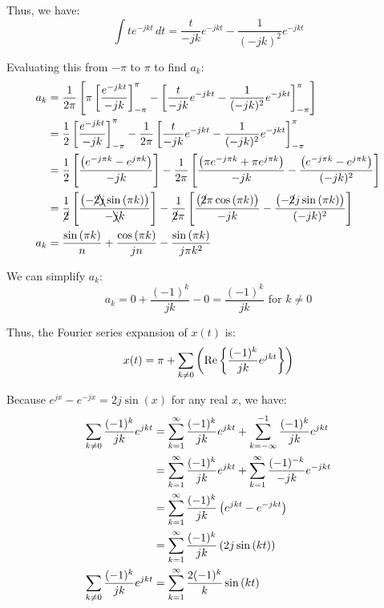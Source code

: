 \documentclass[a4paper, 10pt]{article}
\begin{document}
\begin{tosubmit}
Thus, we have:
\[ \int t e^{-j k t} \,dt = \frac{t}{-j k} e^{-j k t} - \frac{1}{(-j k)^2} e^{-j k t} \]

\newpage

Evaluating this from \( -\pi \) to \( \pi \) to find \( a_k \):
\begin{align*}
    a_k &= \frac{1}{2\pi} \left[ \pi \left[ \frac{e^{-j k t}}{-j k} \right]_{-\pi}^{\pi} - \left[ \frac{t}{-j k} e^{-j k t} - \frac{1}{(-j k)^2} e^{-j k t} \right]_{-\pi}^{\pi} \right] \\
    &= \frac{1}{2} \left[ \frac{e^{-j k t}}{-j k} \right]_{-\pi}^{\pi} - \frac{1}{2\pi} \left[ \frac{t}{-j k} e^{-j k t} - \frac{1}{(-j k)^2} e^{-j k t} \right]_{-\pi}^{\pi} \\
    &= \frac{1}{2} \left[ \frac{ \left( e^{-j \pi k} - e^{j \pi k} \right) }{-j k} \right] - \frac{1}{2\pi} \left[ \frac{ \left( \pi e^{-j \pi k} + \pi e^{j \pi k} \right) }{-j k} - \frac{ \left( e^{-j \pi k} - e^{j \pi k} \right) }{(-j k)^2} \right] \\
    &= \frac{1}{\cancel{2}} \left[ \frac{ \left( -\cancel{2} \bcancel{j} \sin{(\pi k)} \right) }{- \bcancel{j} k} \right] - \frac{1}{\cancel{2}\pi} \left[ \frac{ \left( \cancel{2}\pi \cos{(\pi k)} \right) }{-j k} - \frac{ \left( -\cancel{2}j\sin{(\pi k)} \right) }{(-j k)^2} \right] \\
    a_k &= \frac{ \sin{(\pi k)} }{n} + \frac{ \cos{(\pi k)} }{jn} - \frac{ \sin{(\pi k)} }{j\pi k^2}
\end{align*}

We can simplify \( a_k \):
\[
a_k = 0 + \frac{ (-1)^k }{jk} - 0 = \frac{ (-1)^k }{jk} \text{ for } k \neq 0
\]

Thus, the Fourier series expansion of \( x(t) \) is:
\[ x(t) = \pi + \sum_{k \neq 0} \left( \text{Re} \left\{ \frac{(-1)^k}{jk} e^{j k t} \right\} \right) \]

Because \( e^{jx} - e^{-jx} = 2j\sin{(x)} \) for any real \( x \), we have:
\begin{align*}
    \sum_{k \neq 0} \frac{(-1)^k}{jk} e^{j k t} &= \sum_{k=1}^{\infty} \frac{(-1)^k}{jk} e^{j k t} + \sum_{k=-\infty}^{-1} \frac{(-1)^k}{jk} e^{j k t} \\
    &= \sum_{k=1}^{\infty} \frac{(-1)^k}{jk} e^{j k t} + \sum_{k=1}^{\infty} \frac{(-1)^{-k}}{-jk} e^{-j k t} \\
    &= \sum_{k=1}^{\infty} \frac{(-1)^k}{jk} \left( e^{j k t} - e^{-j k t} \right) \\
    &= \sum_{k=1}^{\infty} \frac{(-1)^k}{jk} \left( 2j\sin{(k t)} \right) \\
    \sum_{k \neq 0} \frac{(-1)^k}{jk} e^{j k t} &= \sum_{k=1}^{\infty} \frac{2(-1)^k}{k} \sin{(k t)}
\end{align*}


\end{tosubmit}
\end{document}
